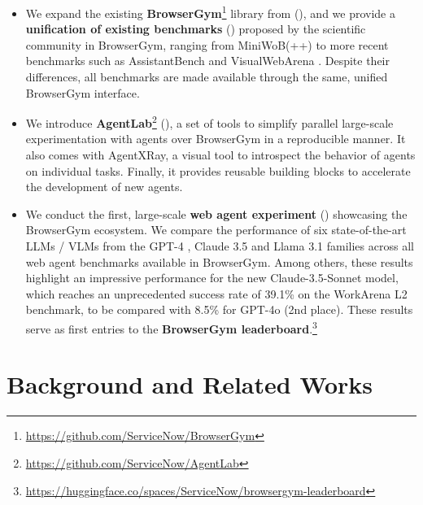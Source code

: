 \documentclass[10pt]{article} %
\begin{document}
\begin{itemize}

    \item We expand the existing \textbf{BrowserGym}\footnote{\url{https://github.com/ServiceNow/BrowserGym}} library from \citet{workarena} (), and we provide a \textbf{unification of existing benchmarks} () proposed by the scientific community in BrowserGym, ranging from MiniWoB(++) \citep{world-of-bits, Miniwob_plusplus} to more recent benchmarks such as AssistantBench \citep{assistant-bench} and VisualWebArena \citep{visual-webarena}. Despite their differences, all benchmarks are made available through the same, unified BrowserGym interface.

    \item We introduce \textbf{AgentLab}\footnote{\url{https://github.com/ServiceNow/AgentLab}}  (), a set of tools to simplify parallel large-scale experimentation with agents over BrowserGym in a reproducible manner. It also comes with AgentXRay, a visual tool to introspect the behavior of agents on individual tasks. Finally, it provides reusable building blocks to accelerate the development of new agents.
    
    \item We conduct the first, large-scale \textbf{web agent experiment} () showcasing the BrowserGym ecosystem. We compare the performance of six state-of-the-art LLMs / VLMs from the GPT-4 \citep{gpt-4}, Claude 3.5 \citep{claude} and Llama 3.1 families \citep{llama3} across all web agent benchmarks available in BrowserGym. Among others, these results highlight an impressive performance for the new Claude-3.5-Sonnet model, which reaches an unprecedented success rate of 39.1\% on the WorkArena L2 benchmark, to be compared with 8.5\% for GPT-4o (2nd place). These results serve as first entries to the \textbf{BrowserGym leaderboard}.\footnote{\url{https://huggingface.co/spaces/ServiceNow/browsergym-leaderboard}}

\end{itemize}

\section{Background and Related Works}
\label{sec:background}
\end{document}
